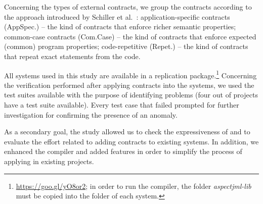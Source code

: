 Concerning the types of external contracts, we group the contracts according to
the approach introduced by Schiller et al.~\cite{typeContracts}: application-specific contracts
(AppSpec.) -- the kind of contracts that enforce richer semantic properties;
 common-case contracts (Com.Case) -- the kind of contracts that enforce
expected (common) program properties;
code-repetitive (Repet.) -- the kind of
contracts that repeat exact statements from the code.

All systems used in this study are available in a replication
package.\footnote{\url{https://goo.gl/yO8or2}; in order to run the
\contractjdoc{} compiler, the folder \textit{aspectjml-lib} must be copied into the folder of each system.}
Concerning the verification performed after applying \contractjdoc{} contracts into the systems,
we used the test suites available with the purpose of identifying problems
(four out of \totalSystems{} projects have a test suite available).
Every test case that failed prompted for further investigation for confirming the presence of an anomaly.

As a secondary goal, the study allowed us to check the expressiveness of \contractjdoc{} and to
evaluate the effort related to adding contracts to existing systems.
In addition, we enhanced the compiler and added features in order to simplify
the process of applying \contractjdoc{} in existing projects.

